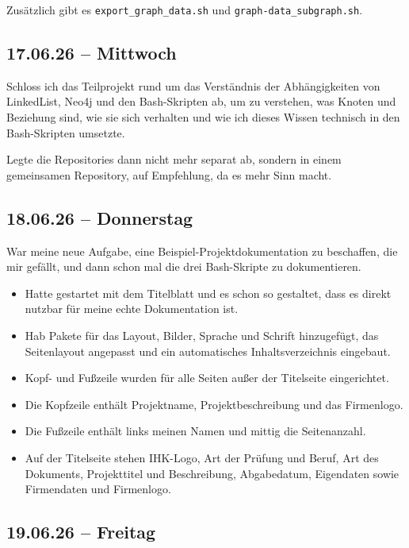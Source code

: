 {Zusätzlich gibt es \texttt{export\_graph\_data.sh} und \texttt{graph-data\_subgraph.sh}.

\subsection{17.06.26 -- Mittwoch}

Schloss ich das Teilprojekt rund um das Verständnis der Abhängigkeiten von LinkedList, Neo4j und den Bash-Skripten ab, um zu verstehen, was Knoten und Beziehung sind, wie sie sich verhalten und wie ich dieses Wissen technisch in den Bash-Skripten umsetzte.

Legte die Repositories dann nicht mehr separat ab, sondern in einem gemeinsamen Repository, auf Empfehlung, da es mehr Sinn macht.

\subsection{18.06.26 -- Donnerstag}

War meine neue Aufgabe, eine Beispiel-Projektdokumentation zu beschaffen, die mir gefällt, und dann schon mal die drei Bash-Skripte zu dokumentieren.

\begin{itemize}
    \item Hatte gestartet mit dem Titelblatt und es schon so gestaltet, dass es direkt nutzbar für meine echte Dokumentation ist.
    \item Hab Pakete für das Layout, Bilder, Sprache und Schrift hinzugefügt, das Seitenlayout angepasst und ein automatisches Inhaltsverzeichnis eingebaut.
    \item Kopf- und Fußzeile wurden für alle Seiten außer der Titelseite eingerichtet.
    \item Die Kopfzeile enthält Projektname, Projektbeschreibung und das Firmenlogo.
    \item Die Fußzeile enthält links meinen Namen und mittig die Seitenanzahl.
    \item Auf der Titelseite stehen IHK-Logo, Art der Prüfung und Beruf, Art des Dokuments, Projekttitel und Beschreibung, Abgabedatum, Eigendaten sowie Firmendaten und Firmenlogo.
\end{itemize}

\subsection{19.06.26 -- Freitag}

}
